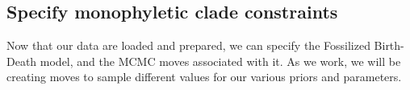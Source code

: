 \bigskip

\subsection{Specify monophyletic clade constraints}

Now that our data are loaded and prepared, we can specify the Fossilized Birth-Death model, and the MCMC moves associated with it. As we work, we will be creating moves to sample different values for our various priors and parameters. 




%
%
